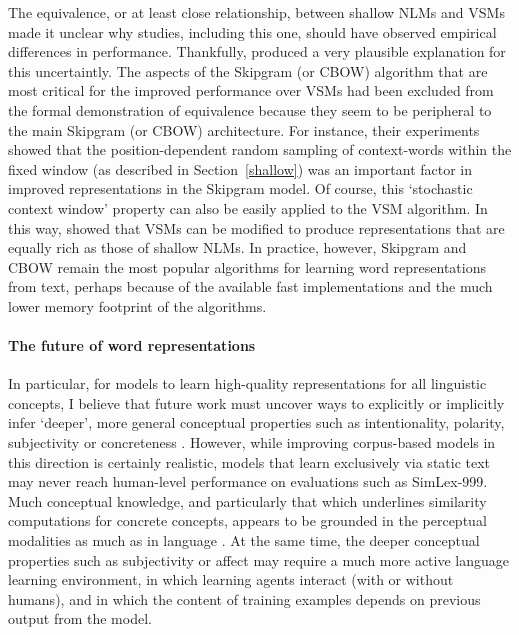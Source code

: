 The equivalence, or at least close relationship, between shallow NLMs and VSMs made it unclear why studies, including this one, should have observed empirical differences in performance. Thankfully, \cite{levy2015improving} produced a very plausible explanation for this uncertaintly. The aspects of the Skipgram (or CBOW) algorithm that are most critical for the improved performance over VSMs had been excluded from the formal demonstration of equivalence because they seem to be peripheral to the main Skipgram (or CBOW) architecture. For instance, their experiments showed that the position-dependent random sampling of context-words within the fixed window (as described in Section~\ref{shallow}) was an important factor in improved representations in the Skipgram model. Of course, this `stochastic context window' property can also be easily applied to the VSM algorithm. In this way, \cite{levy2015improving} showed that VSMs can be modified to produce representations that are equally rich as those of shallow NLMs. In practice, however, Skipgram and CBOW remain the most popular algorithms for learning word representations from text, perhaps because of the available fast implementations and the much lower memory footprint of the algorithms.    

\paragraph{The future of word representations}

In particular, for models to learn high-quality representations for all linguistic concepts, I believe that future work must uncover ways to explicitly or implicitly infer `deeper', more general conceptual properties such as intentionality, polarity, subjectivity or concreteness \citep{gershmanmetaphor}. However, while improving corpus-based models in this direction is certainly realistic, models that learn exclusively via static text may never reach human-level performance on evaluations such as SimLex-999. Much conceptual knowledge, and particularly that which underlines similarity computations for concrete concepts, appears to be grounded in the perceptual modalities as much as in language \citep{barsalou2003grounding}. At the same time, the deeper conceptual properties such as subjectivity or affect may require a much more active language learning environment, in which learning agents interact (with or without humans), and in which the content of training examples depends on previous output from the model.

